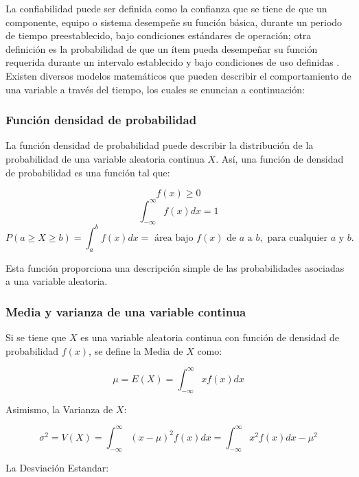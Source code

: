 La confiabilidad puede ser definida como la confianza que se tiene de que un componente, equipo o sistema desempeñe su función básica, durante un periodo de tiempo preestablecido, bajo condiciones estándares de operación; otra definición es la probabilidad de que un ítem pueda desempeñar su función requerida durante un intervalo establecido y bajo condiciones de uso definidas \citep{dairo2016}. Existen diversos modelos matemáticos que pueden describir el comportamiento de una variable a través del tiempo, los cuales se enuncian a continuación:

\subsubsection{Función densidad de probabilidad}

La función densidad de probabilidad puede describir la distribución de la probabilidad de una variable aleatoria continua $X$. Así, una función de densidad de probabilidad es una función tal que:


 $$f(x)\geqslant 0$$
 $$\int_{-\infty}^{\infty}f(x)dx=1$$
 \begin{equation*}
 P(a\geqslant X \geqslant b)=\int_{a}^{b}f(x)dx= \text{ área bajo } f(x) \text{ de } a \text{ a } b, \text{ para cualquier } a \text{ y } b.
 \end{equation*}



Esta función proporciona una descripción simple de las probabilidades asociadas a una variable aleatoria.

\subsubsection{Media y varianza de una variable continua}

Si se tiene que $X$ es una variable aleatoria continua con función de densidad de probabilidad $f(x)$, se define la Media de $X$ como:

\begin{equation}
\mu=E(X)=\int_{-\infty}^{\infty}xf(x)dx
\end{equation}

Asimismo, la Varianza de $X$:

\begin{equation}
\sigma^2=V(X)=\int_{-\infty}^{\infty}(x-\mu)^{2}f(x)dx=\int_{-\infty}^{\infty}x^{2}f(x)dx-\mu^2
\end{equation}

La Desviación Estandar:

